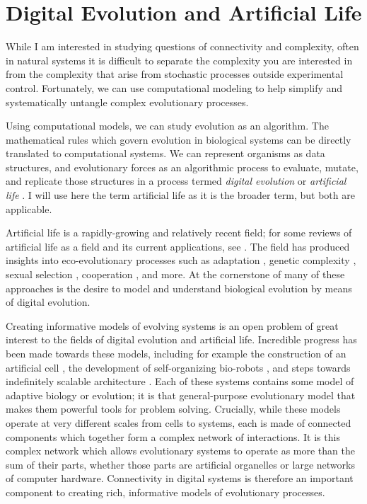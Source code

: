 \section{Digital Evolution and Artificial Life}

While I am interested in studying questions of connectivity and complexity, often in natural systems it is difficult to separate the complexity you are interested in from the complexity that arise from stochastic processes outside experimental control.
Fortunately, we can use computational modeling to help simplify and systematically untangle complex evolutionary processes.

Using computational models, we can study evolution as an algorithm. 
The mathematical rules which govern evolution in biological systems can be directly translated to computational systems.  
We can represent organisms as data structures, and evolutionary forces as an algorithmic process to evaluate, mutate, and replicate those structures in a process termed \textit{digital evolution} or \textit{artificial life} \cite{oneill_digital_2003}. 
I will use here the term artificial life as it is the broader term, but both are applicable.

Artificial life is a rapidly-growing and relatively recent field; for some reviews of artificial life as a field and its current applications, see 
\citep{oneill_digital_2003, mcmullin_thirty_2004, kim_comprehensive_2006, aguilar_past_2014}. 
The field has produced insights into eco-evolutionary processes such as
adaptation \citep{wilke_evolution_2001}, 
genetic complexity \citep{ostman_impact_2011}, 
sexual selection \citep{bohm_sexual_2020},
cooperation \citep{vostinar_spatial_2019}, 
and more.
At the cornerstone of many of these approaches is the desire to model and understand biological evolution by means of digital evolution.

Creating informative models of evolving systems is an open problem of great interest to the fields of digital evolution and artificial life.
Incredible progress has been made towards these models, including for example
the construction of an artificial cell \citep{frischmon_build--cell_2021}, 
the development of self-organizing bio-robots \citep{kriegman_scalable_2020}, and 
steps towards indefinitely scalable architecture \citep{ackley_indefinitely_2014}. 
Each of these systems contains some model of adaptive biology or evolution; it is that general-purpose evolutionary model that makes them powerful tools for problem solving. 
Crucially, while these models operate at very different scales from cells to systems, each is made of connected components which together form a complex network of interactions.
It is this complex network which allows evolutionary systems to operate as more than the sum of their parts, whether those parts are artificial organelles or large networks of computer hardware. 
Connectivity in digital systems is therefore an important component to creating rich, informative models of evolutionary processes.


